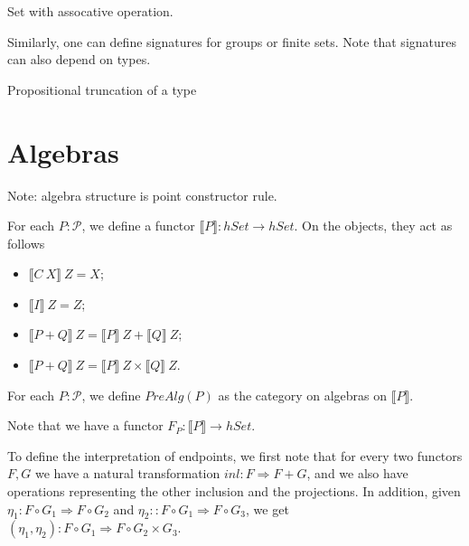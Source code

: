\documentclass[9pt]{entcs}
\newcommand{\type}[1]{#1}
\newcommand{\constructor}[1]{#1}
\newcommand{\category}[1]{#1}
\newcommand{\nattranstxt}[1]{#1}
\newcommand{\hset}{\type{hSet}} %
\newcommand{\1}{\type{1}} %
\newcommand{\functor}[2]{#1 \rightarrow #2} %
\newcommand{\compf}[2]{#1 \circ #2} %
\newcommand{\prodf}[2]{#1 \times #2} %
\newcommand{\sumf}[2]{#1 + #2} %
\newcommand{\nattrans}[2]{#1 \Rightarrow #2} %
\newcommand{\inlt}{\nattranstxt{inl}} %
\newcommand{\pairt}[2]{(#1 , #2)} %
\newcommand{\poly}{\mathcal{P}} %
\newcommand{\C}{\constructor{C}} %
\newcommand{\I}{\constructor{I}} %
\newcommand{\sumP}[2]{#1 + #2} %
\newcommand{\semP}[1]{\llbracket #1 \rrbracket} %
\newcommand{\prealg}[1]{\category{PreAlg}(#1)} %
\newcommand{\forget}[1]{F_{#1}} %
\begin{document}
\begin{example}
Set with assocative operation.
\end{example}

Similarly, one can define signatures for groups or finite sets.
Note that signatures can also depend on types.

\begin{example}
Propositional truncation of a type
\end{example}

\section{Algebras}
Note: algebra structure is point constructor rule.

\begin{definition}
For each $P : \poly$, we define a functor $\semP{P} : \functor{\hset}{\hset}$. On the objects, they act as follows
\begin{itemize}
	\item $\semP{\C \> X} \> Z = X$;
	\item $\semP{\I} \> Z = Z$;
	\item $\semP{\sumP{P}{Q}} \> Z = \semP{P} \> Z + \semP{Q} \> Z$;
	\item $\semP{\sumP{P}{Q}} \> Z = \semP{P} \> Z \times \semP{Q} \> Z$.
\end{itemize}
\end{definition}

\begin{definition}
For each $P : \poly$, we define $\prealg{P}$ as the category on algebras on $\semP{P}$.
\end{definition}

Note that we have a functor $\forget{P} : \functor{\semP{P}}{\hset}$.

To define the interpretation of endpoints, we first note that for every two functors $F, G$ we have a natural transformation $\inlt : \nattrans{F}{\sumf{F}{G}}$, and we also have operations representing the other inclusion and the projections.
In addition, given $\eta_1 : \nattrans{\compf{F}{G_1}}{\compf{F}{G_2}}$ and $\eta_2 : : \nattrans{\compf{F}{G_1}}{\compf{F}{G_3}}$, we get $\pairt{\eta_1}{\eta_2} : \nattrans{\compf{F}{G_1}}{\compf{F}{\prodf{G_2}{G_3}}}$.
\end{document}
